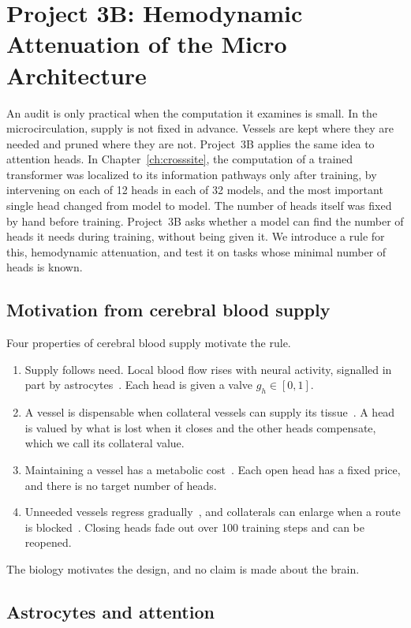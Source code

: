 \section{Project 3B: Hemodynamic Attenuation of the Micro Architecture}
\label{sec:3b}

An audit is only practical when the computation it examines is small. In the microcirculation, supply is not fixed in advance. Vessels are kept where they are needed and pruned where they are not. Project~3B applies the same idea to attention heads. In Chapter~\ref{ch:crosssite}, the computation of a trained transformer was localized to its information pathways only after training, by intervening on each of 12 heads in each of 32 models, and the most important single head changed from model to model. The number of heads itself was fixed by hand before training. Project~3B asks whether a model can find the number of heads it needs during training, without being given it. We introduce a rule for this, hemodynamic attenuation, and test it on tasks whose minimal number of heads is known.

\subsection{Motivation from cerebral blood supply}

Four properties of cerebral blood supply motivate the rule.
\begin{enumerate}[leftmargin=2.2em,itemsep=2pt]
\item Supply follows need. Local blood flow rises with neural activity, signalled in part by astrocytes~\citep{attwell2010}. Each head is given a valve $g_h \in [0,1]$.
\item A vessel is dispensable when collateral vessels can supply its tissue~\citep{faber2014}. A head is valued by what is lost when it closes and the other heads compensate, which we call its collateral value.
\item Maintaining a vessel has a metabolic cost~\citep{murray1926}. Each open head has a fixed price, and there is no target number of heads.
\item Unneeded vessels regress gradually~\citep{chen2012, franco2015}, and collaterals can enlarge when a route is blocked~\citep{faber2014}. Closing heads fade out over 100 training steps and can be reopened.
\end{enumerate}
The biology motivates the design, and no claim is made about the brain.

\subsection{Astrocytes and attention}


